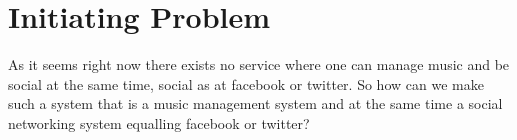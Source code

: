 \section{Initiating Problem}
As it seems right now there exists no service where one can manage music and be
social at the same time, social as at facebook or twitter. 
So how can we make such a system that is a music management system and at 
the same time a social networking system equalling facebook or twitter?
